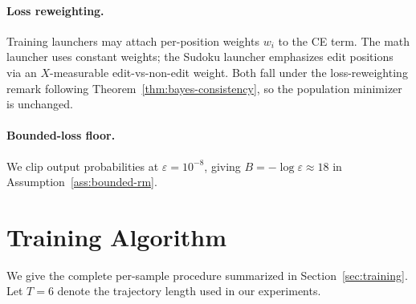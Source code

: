 \paragraph{Loss reweighting.}
Training launchers may attach per-position weights $w_i$ to the CE term. The math launcher uses constant weights; the Sudoku launcher emphasizes edit positions via an $X$-measurable edit-vs-non-edit weight. Both fall under the loss-reweighting remark following Theorem~\ref{thm:bayes-consistency}, so the population minimizer is unchanged.

\paragraph{Bounded-loss floor.}
We clip output probabilities at $\varepsilon = 10^{-8}$, giving $B = -\log\varepsilon \approx 18$ in Assumption~\ref{ass:bounded-rm}.


\section{Training Algorithm}
\label{app:training-algo}

We give the complete per-sample procedure summarized in Section~\ref{sec:training}. Let $T = 6$ denote the trajectory length used in our experiments.

